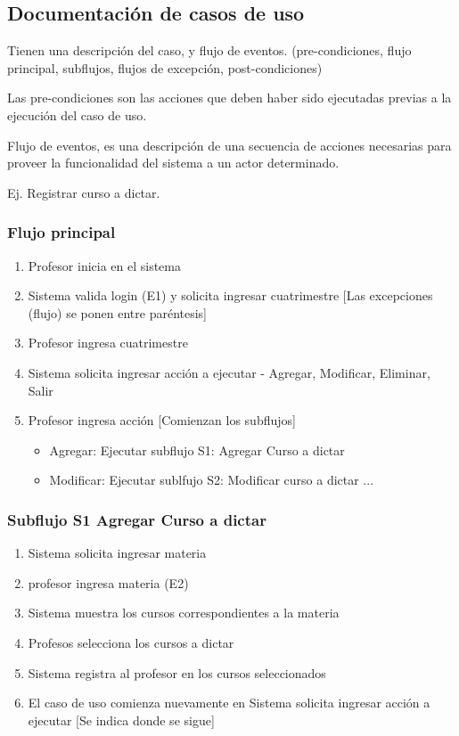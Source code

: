 \documentclass[titlepage,a4paper]{article}
\begin{document}


\subsection*{Documentación de casos de uso}
Tienen una descripción del caso, y flujo de eventos. (pre-condiciones, flujo principal, subflujos, flujos de excepción, post-condiciones)

Las pre-condiciones son las acciones que deben haber sido ejecutadas previas a la ejecución del caso de uso. 

Flujo de eventos, es una descripción de una secuencia de acciones necesarias para proveer la funcionalidad del sistema a un actor determinado.

Ej. Registrar curso a dictar.

\subsubsection*{Flujo principal}
\begin{enumerate}
    \item Profesor inicia en el sistema
    \item Sistema valida login (E1) y solicita ingresar cuatrimestre   [Las excepciones (flujo) se ponen entre paréntesis]
    \item Profesor ingresa cuatrimestre
    \item Sistema solicita ingresar acción a ejecutar - Agregar, Modificar, Eliminar, Salir
    \item Profesor ingresa acción
    [Comienzan los subflujos]
    \begin{itemize}
        \item Agregar: Ejecutar subflujo S1: Agregar Curso a dictar
        \item Modificar: Ejecutar sublfujo S2: Modificar curso a dictar
        ...
    \end{itemize}
\end{enumerate}

\subsubsection*{Subflujo S1 Agregar Curso a dictar}
\begin{enumerate}
    \item Sistema solicita ingresar materia
    \item profesor ingresa materia (E2)
    \item Sistema muestra los cursos correspondientes a la materia
    \item Profesos selecciona los cursos a dictar
    \item Sistema registra al profesor en los cursos seleccionados
    \item El caso de uso comienza nuevamente en Sistema solicita ingresar acción a ejecutar    [Se indica donde se sigue]
\end{enumerate}
\end{document}
